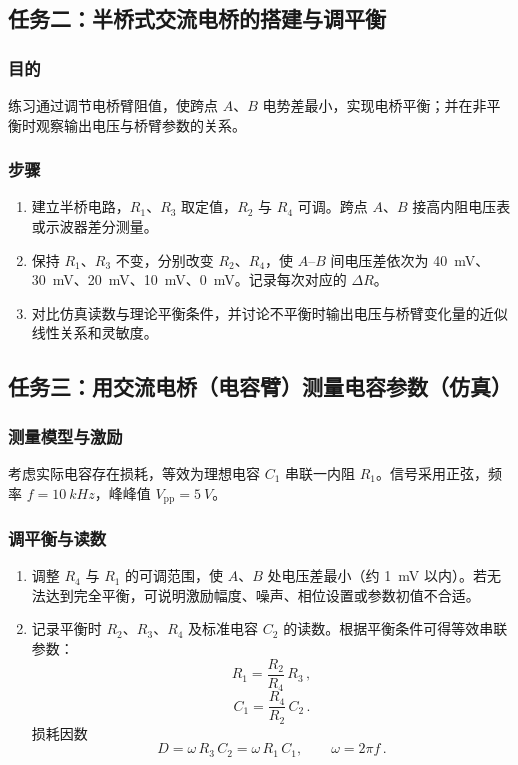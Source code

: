 \documentclass[a4paper,8pt,twocolumn]{article}
\begin{document}
\subsection{任务二：半桥式交流电桥的搭建与调平衡}
\subsubsection*{目的}
练习通过调节电桥臂阻值，使跨点 $A$、$B$ 电势差最小，实现电桥平衡；并在非平衡时观察输出电压与桥臂参数的关系。

\subsubsection*{步骤}
\begin{enumerate}
  \item 建立半桥电路，$R_1$、$R_3$ 取定值，$R_2$ 与 $R_4$ 可调。跨点 $A$、$B$ 接高内阻电压表或示波器差分测量。
  \item 保持 $R_1$、$R_3$ 不变，分别改变 $R_2$、$R_4$，使 $A$--$B$ 间电压差依次为 \SI{40}{mV}、\SI{30}{mV}、\SI{20}{mV}、\SI{10}{mV}、\SI{0}{mV}。记录每次对应的 $\Delta R$。
  \item 对比仿真读数与理论平衡条件，并讨论不平衡时输出电压与桥臂变化量的近似线性关系和灵敏度。
\end{enumerate}

\subsection{任务三：用交流电桥（电容臂）测量电容参数（仿真）}
\subsubsection*{测量模型与激励}
考虑实际电容存在损耗，等效为理想电容 $C_1$ 串联一内阻 $R_1$。信号采用正弦，频率 $f=\SI{10}{kHz}$，峰峰值 $V_{\mathrm{pp}}=\SI{5}{V}$。

\subsubsection*{调平衡与读数}
\begin{enumerate}
  \item 调整 $R_4$ 与 $R_1$ 的可调范围，使 $A$、$B$ 处电压差最小（约 \SI{1}{mV} 以内）。若无法达到完全平衡，可说明激励幅度、噪声、相位设置或参数初值不合适。
  \item 记录平衡时 $R_2$、$R_3$、$R_4$ 及标准电容 $C_2$ 的读数。根据平衡条件可得等效串联参数：
  \begin{equation}
    R_1=\frac{R_2}{R_4}\,R_3\,, \tag{G4.1}
  \end{equation}
  \begin{equation}
    C_1=\frac{R_4}{R_2}\,C_2\,. \tag{G4.2}
  \end{equation}
  损耗因数
  \begin{equation}
    D=\omega\,R_3\,C_2=\omega\,R_1\,C_1,\qquad \omega=2\pi f\,. \tag{G4.3}
  \end{equation}
\end{enumerate}
\end{document}
